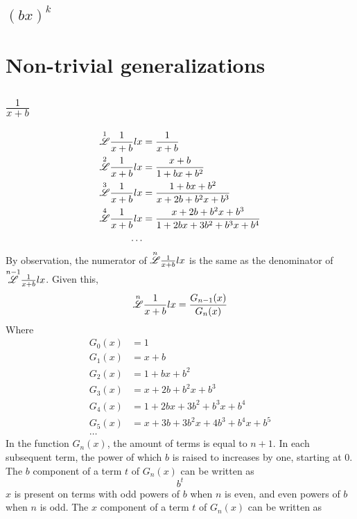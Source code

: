 \documentclass[12pt, letterpaper]{article}
\begin{document}
\subsection{$(bx)^k$}

\newpage
\section{Non-trivial generalizations}

\subsection{$\frac{1}{x+b}$}
\begin{equation}
    \begin{split}
        \overset{1}{\mathscr{L}} \frac{1}{x+b} lx & = \frac{1}{x+b}\\
        \overset{2}{\mathscr{L}} \frac{1}{x+b} lx & = \frac{x+b}{1+bx+b^2}\\
        \overset{3}{\mathscr{L}} \frac{1}{x+b} lx & = \frac{1+bx+b^2}{x+2b+b^2x+b^3}\\
        \overset{4}{\mathscr{L}} \frac{1}{x+b} lx & = \frac{x+2b+b^2x+b^3}{1+2bx+3b^2+b^3x+b^4}\\
        \dots
    \end{split}
\end{equation}
By observation, the numerator of $\overset{n}{\mathscr{L}} \frac{1}{x+b} lx$ is the same as the denominator of $\overset{n-1}{\mathscr{L}} \frac{1}{x+b} lx$. Given this,
$$\overset{n}{\mathscr{L}} \frac{1}{x+b} lx = \frac{G_{n-1}(x)}{G_n(x)}$$
Where
\begin{equation}
    \begin{split}
        G_0(x) & = 1\\
        G_1(x) & = x+b\\
        G_2(x) & = 1+bx+b^2\\
        G_3(x) & = x+2b+b^2x+b^3\\
        G_4(x) & = 1+2bx+3b^2+b^3x+b^4\\
        G_5(x) & = x+3b+3b^2x+4b^3+b^4x+b^5\\
        \dots 
    \end{split}
\end{equation}
In the function $G_n(x)$, the amount of terms is equal to $n+1$. In each subsequent term, the power of which $b$ is raised to increases by one, starting at $0$. The $b$ component of a term $t$ of $G_n(x)$ can be written as
$$b^t$$
$x$ is present on terms with odd powers of $b$ when $n$ is even, and even powers of $b$ when $n$ is odd. The $x$ component of a term $t$ of $G_n(x)$ can be written as
\end{document}
